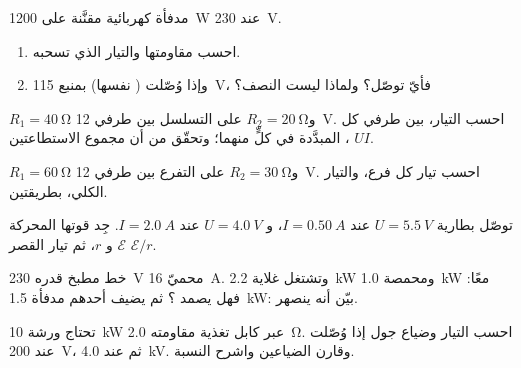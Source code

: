 \begin{exercise}[$\star\star$]\label{exo:g11:circuits-and-power:6}
مدفأة كهربائية مقنَّنة على \qty{1200}{W} عند \qty{230}{V}.
\begin{enumerate}
  \item احسب مقاومتها والتيار الذي تسحبه.
  \item وإذا وُصّلت ( نفسها) بمنبع \qty{115}{V}، فأيّ 
        توصّل؟ ولماذا ليست النصف؟
\end{enumerate}
\end{exercise}

\begin{exercise}[$\star\star$]\label{exo:g11:circuits-and-power:7}
$R_1 = \qty{40}{\ohm}$ و$R_2 = \qty{20}{\ohm}$ على التسلسل بين طرفي
\qty{12}{V}. احسب التيار،  بين طرفي كل ،
 المبدَّدة في كلٍّ منهما؛ وتحقّق من أن مجموع الاستطاعتين $UI$.
\end{exercise}

\begin{exercise}[$\star\star$]\label{exo:g11:circuits-and-power:8}
$R_1 = \qty{60}{\ohm}$ و$R_2 = \qty{30}{\ohm}$ على التفرع بين طرفي
\qty{12}{V}. احسب تيار كل فرع، والتيار الكلي،  بطريقتين.
\end{exercise}

\begin{exercise}[$\star\star$]\label{exo:g11:circuits-and-power:9}
توصّل بطارية $U = \qty{5.5}{V}$ عند $I = \qty{0.50}{A}$، و
$U = \qty{4.0}{V}$ عند $I = \qty{2.0}{A}$. جِد قوتها المحركة $\mathcal{E}$ و
 $r$، ثم تيار القصر $\mathcal{E}/r$.
\end{exercise}

\begin{exercise}[$\star\star$]\label{exo:g11:circuits-and-power:10}
خط مطبخ قدره \qty{230}{V} محميّ  \qty{16}{A}. وتشتغل
غلاية \qty{2.2}{kW} ومحمصة \qty{1.0}{kW} معًا: فهل يصمد
؟ ثم يضيف أحدهم مدفأة \qty{1.5}{kW}: بيّن أنه ينصهر.
\end{exercise}

\begin{exercise}[$\star\star$]\label{exo:g11:circuits-and-power:11}
تحتاج ورشة \qty{10}{kW} عبر كابل تغذية مقاومته
\qty{2.0}{\ohm}. احسب التيار وضياع جول إذا وُصّلت 
عند \qty{200}{V}، ثم عند \qty{4.0}{kV}. وقارن الضياعين
واشرح النسبة.
\end{exercise}

